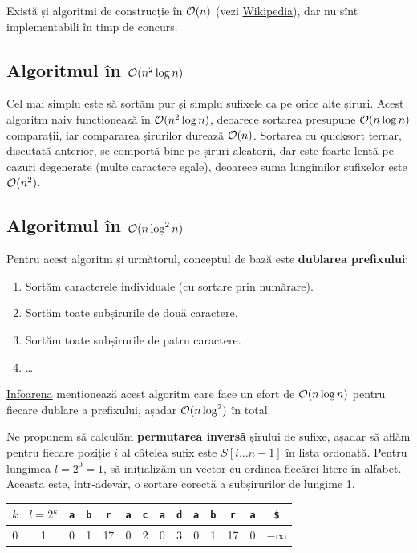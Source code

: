 \documentclass[../main.tex]{subfiles}
\begin{document}
Există și algoritmi de construcție în $\mathcal{O}(n)$ (vezi \href{https://en.wikipedia.org/wiki/Suffix_array}{Wikipedia}), dar nu sînt implementabili în timp de concurs.
\subsection{Algoritmul în \texorpdfstring{$\mathcal{O}(n^2 \log n)$}{O(n² log n)}}

Cel mai simplu este să sortăm pur și simplu sufixele ca pe orice alte șiruri. Acest algoritm naiv funcționează în $\mathcal{O}(n^2 \log n)$, deoarece sortarea presupune $\mathcal{O}(n \log n)$ comparații, iar compararea șirurilor durează $\mathcal{O}(n)$. Sortarea cu quicksort ternar, discutată anterior, se comportă bine pe șiruri aleatorii, dar este foarte lentă pe cazuri degenerate (multe caractere egale), deoarece suma lungimilor sufixelor este $\mathcal{O}(n^2)$.

\subsection{Algoritmul în \texorpdfstring{$\mathcal{O}(n \log^2 n)$}{O(n log² n)}}

Pentru acest algoritm și următorul, conceptul de bază este \textbf{dublarea prefixului}:

\begin{enumerate}
  \item Sortăm caracterele individuale (cu sortare prin numărare).
  \item Sortăm toate subșirurile de două caractere.
  \item Sortăm toate subșirurile de patru caractere.
  \item \dots
\end{enumerate}

\href{https://www.infoarena.ro/siruri-de-sufixe}{Infoarena} menționează acest algoritm care face un efort de $\mathcal{O}(n \log n)$ pentru fiecare dublare a prefixului, așadar $\mathcal{O}(n \log^2)$ în total.

Ne propunem să calculăm \textbf{permutarea inversă} șirului de sufixe, așadar să aflăm pentru fiecare poziție $i$ al câtelea sufix este $S[i \dots n - 1]$ în lista ordonată. Pentru lungimea $l = 2^0 = 1$, să inițializăm un vector cu ordinea fiecărei litere în alfabet. Aceasta este, într-adevăr, o sortare corectă a subșirurilor de lungime 1.

\begin{table}[H]
  \centering
  \begin{tabular}{c|c|cccccccccccc}
    \textbf{$k$} & \textbf{$l = 2^k$} & \texttt{a} & \texttt{b} & \texttt{r} & \texttt{a} & \texttt{c} & \texttt{a} & \texttt{d} & \texttt{a} & \texttt{b} & \texttt{r} & \texttt{a} & \texttt{\$} \\
    \hline
    0 & 1 & 0 & 1 & 17 & 0 & 2 & 0 & 3 & 0 & 1 & 17 & 0 & $-\infty$ \\
  \end{tabular}
\end{table}
\end{document}
